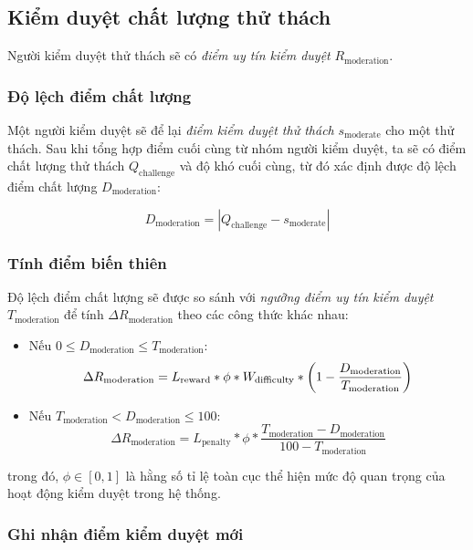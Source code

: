 \subsection{Kiểm duyệt chất lượng thử thách}

Người kiểm duyệt thử thách sẽ có \textit{điểm uy tín kiểm duyệt} $R_{\text{moderation}}$.

\subsubsection{Độ lệch điểm chất lượng}

Một người kiểm duyệt sẽ để lại \textit{điểm kiểm duyệt thử thách} $s_{\text{moderate}}$ cho một thử thách. Sau khi tổng hợp điểm cuối cùng từ nhóm người kiểm duyệt,
ta sẽ có điểm chất lượng thử thách $Q_{\text{challenge}}$ và độ khó cuối cùng, từ đó xác định được độ lệch điểm chất lượng $D_{\text{moderation}}$:

\[D_{\text{moderation}}=|Q_{\text{challenge}}-s_{\text{moderate}}|\]

\subsubsection{Tính điểm biến thiên}

Độ lệch điểm chất lượng sẽ được so sánh với \textit{ngưỡng điểm uy tín kiểm duyệt} $T_{\text{moderation}}$ để tính $\Delta R_{\text{moderation}}$ theo các công thức khác nhau:

\begin{itemize}
  \item Nếu $0 \leq D_{\text{moderation}} \leq  T_{\text{moderation}}$:
        \[\Delta R_{\text{\text{moderation}}} = L_{\text{reward}}*\phi * W_{\text{difficulty}} * \left(1 - \frac{D_{\text{moderation}}}{T_{\text{moderation}}}\right) \]
  \item Nếu $T_{\text{moderation}} < D_{\text{moderation}} \leq 100$:
        \[\Delta R_{{\text{moderation}}} = L_{\text{penalty}} * \phi * \frac{T_{\text{moderation}} - D_{\text{moderation}}}{100-T_{\text{moderation}}} \]
\end{itemize}
trong đó, $\phi \in [0, 1]$ là hằng số tỉ lệ toàn cục thể hiện mức độ quan trọng của hoạt động kiểm duyệt trong hệ thống.

\subsubsection{Ghi nhận điểm kiểm duyệt mới}

